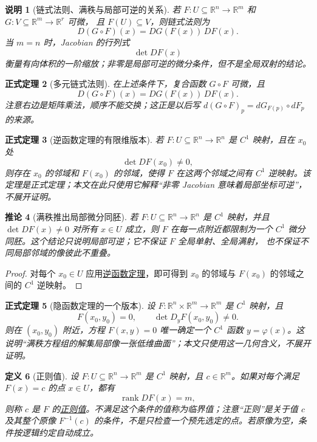 \documentclass[UTF8,fontset=none,a4paper,11pt]{ctexart}
\theoremstyle{foundation-definition}
\newtheorem{definition}{定义}[section]
\theoremstyle{foundation-theorem}
\newtheorem{theorem}[definition]{正式定理}
\theoremstyle{foundation-proposition}
\theoremstyle{foundation-example}
\theoremstyle{foundation-remark}
\newtheorem{remark}[definition]{说明}
\theoremstyle{foundation-theorem}
\newtheorem{corollary}[definition]{推论}
\newcommand{\term}[2]{\hyperref[#1]{#2}}
\begin{document}
\begin{remark}[链式法则、满秩与局部可逆的关系]
若 \(F:U\subseteq\mathbb R^n\to\mathbb R^m\) 和 \(G:V\subseteq\mathbb R^m\to\mathbb R^r\) 可微，
且 \(F(U)\subseteq V\)，则链式法则为
\[
D(G\circ F)(x)=DG(F(x))\,DF(x).
\]
当 \(m=n\) 时，Jacobian 的行列式
\[
\det DF(x)
\]
衡量有向体积的一阶缩放；非零是局部可逆的微分条件，但不是全局双射的结论。
\end{remark}

\begin{theorem}[多元链式法则]
在上述条件下，复合函数 \(G\circ F\) 可微，且
\[
D(G\circ F)(x)=DG(F(x))\,DF(x).
\]
注意右边是矩阵乘法，顺序不能交换；这正是以后写 \(d(G\circ F)_p=dG_{F(p)}\circ dF_p\) 的来源。
\end{theorem}

\begin{theorem}[逆函数定理的有限维版本]\label{thm:inverse-function}
若 \(F:U\subseteq\mathbb R^n\to\mathbb R^n\) 是 \(C^1\) 映射，且在 \(x_0\) 处
\[
\det DF(x_0)\neq0,
\]
则存在 \(x_0\) 的邻域和 \(F(x_0)\) 的邻域，使得 \(F\) 在这两个邻域之间有 \(C^1\) 逆映射。该定理是正式定理；本文在此只使用它解释“非零 Jacobian 意味着局部坐标可逆”，不展开证明。
\end{theorem}

\begin{corollary}[满秩推出局部微分同胚]\label{cor:full-rank-local-diffeomorphism}
若 \(F:U\subseteq\mathbb R^n\to\mathbb R^n\) 是 \(C^1\) 映射，并且
\(\det DF(x)\ne0\) 对所有 \(x\in U\) 成立，则 \(F\) 在每一点附近都限制为一个
\(C^1\) 微分同胚。这个结论只说明局部可逆；它不保证 \(F\) 全局单射、全局满射，
也不保证不同局部邻域的像彼此不重叠。
\end{corollary}

\begin{proof}
对每个 \(x_0\in U\) 应用\term{thm:inverse-function}{逆函数定理}，即可得到
\(x_0\) 的邻域与 \(F(x_0)\) 的邻域之间的 \(C^1\) 逆映射。\end{proof}

\begin{theorem}[隐函数定理的一个版本]
设 \(F:\mathbb R^{n}\times\mathbb R^{m}\to\mathbb R^{m}\) 是 \(C^1\) 映射，且
\[
F(x_0,y_0)=0,\qquad
\det D_yF(x_0,y_0)\neq0.
\]
则在 \((x_0,y_0)\) 附近，方程 \(F(x,y)=0\) 唯一确定一个 \(C^1\) 函数 \(y=\varphi(x)\)。这说明“满秩方程组的解集局部像一张低维曲面”；本文只使用这一几何含义，不展开证明。
\end{theorem}

\begin{definition}[正则值]\label{def:regular-value}
设 \(F:U\subseteq\mathbb R^n\to\mathbb R^m\) 是 \(C^1\) 映射，且 \(c\in\mathbb R^m\)。如果对每个满足 \(F(x)=c\) 的点 \(x\in U\)，都有
\[
 \operatorname{rank}DF(x)=m,
\]
则称 \(c\) 是 \(F\) 的\term{def:regular-value}{正则值}。不满足这个条件的值称为临界值；注意“正则”是关于值 \(c\) 及其整个原像 \(F^{-1}(c)\) 的条件，不是只检查一个预先选定的点。若原像为空，条件按逻辑约定自动成立。
\end{definition}
\end{document}
